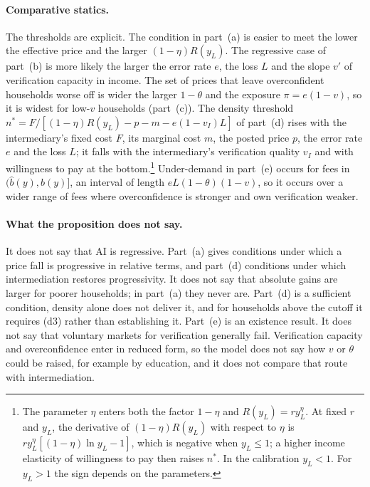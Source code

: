 \documentclass[12pt]{article}
\theoremstyle{remark}
\begin{document}
\paragraph{Comparative statics.} The thresholds are explicit. The condition in part~(a) is easier to meet the lower the effective price and the larger $(1-\eta)R(y_L)$. The regressive case of part~(b) is more likely the larger the error rate $e$, the loss $L$ and the slope $v'$ of verification capacity in income. The set of prices that leave overconfident households worse off is wider the larger $1-\theta$ and the exposure $\pi=e(1-v)$, so it is widest for low-$v$ households (part~(c)). The density threshold $n^*=F/[(1-\eta)R(y_L)-p-m-e(1-v_I)L]$ of part~(d) rises with the intermediary's fixed cost $F$, its marginal cost $m$, the posted price $p$, the error rate $e$ and the loss $L$; it falls with the intermediary's verification quality $v_I$ and with willingness to pay at the bottom.\footnote{The parameter $\eta$ enters both the factor $1-\eta$ and $R(y_L)=ry_L^\eta$. At fixed $r$ and $y_L$, the derivative of $(1-\eta)R(y_L)$ with respect to $\eta$ is $ry_L^\eta[(1-\eta)\ln y_L-1]$, which is negative when $y_L\le1$; a higher income elasticity of willingness to pay then raises $n^*$. In the calibration $y_L<1$. For $y_L>1$ the sign depends on the parameters.} Under-demand in part~(e) occurs for fees in $(\hat b(y),b(y)]$, an interval of length $eL(1-\theta)(1-v)$, so it occurs over a wider range of fees where overconfidence is stronger and own verification weaker.

\paragraph{What the proposition does not say.} It does not say that AI is regressive. Part~(a) gives conditions under which a price fall is progressive in relative terms, and part~(d) conditions under which intermediation restores progressivity. It does not say that absolute gains are larger for poorer households; in part~(a) they never are. Part~(d) is a sufficient condition, density alone does not deliver it, and for households above the cutoff it requires (d3) rather than establishing it. Part~(e) is an existence result. It does not say that voluntary markets for verification generally fail. Verification capacity and overconfidence enter in reduced form, so the model does not say how $v$ or $\theta$ could be raised, for example by education, and it does not compare that route with intermediation.
\end{document}
